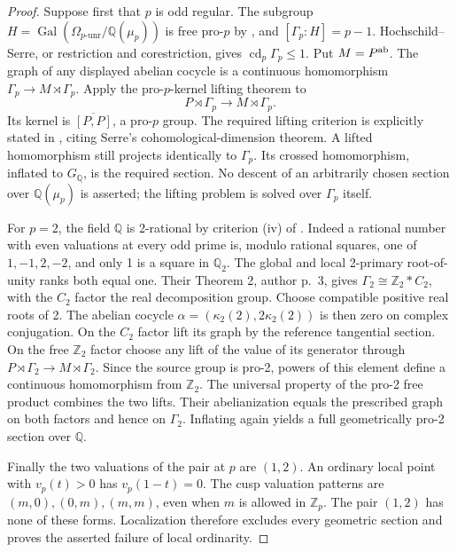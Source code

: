 \begin{proof}
Suppose first that \(p\) is odd regular. The subgroup
\(H=\operatorname{Gal}(\Omega_{p\text{-unr}}/\mathbb Q(\mu_p))\)
is free pro-\(p\) by \citet[Lemma 3.2, author p.~14]{LitHoshi2010},
and \([\Gamma_p:H]=p-1\). Hochschild--Serre, or restriction and
corestriction, gives \(\operatorname{cd}_p\Gamma_p\le1\).
Put \(M=P^{\rm ab}\). The graph of any displayed abelian cocycle is
a continuous homomorphism \(\Gamma_p\to M\rtimes\Gamma_p\).
Apply the pro-\(p\)-kernel lifting theorem to
\[
 P\rtimes\Gamma_p\longrightarrow M\rtimes\Gamma_p.
\]
Its kernel is \(\overline{[P,P]}\), a pro-\(p\) group. The required
lifting criterion is explicitly stated in
\citet[Proposition 4.3, p.~149]{LitPachecoStevenson2000}, citing
Serre's cohomological-dimension theorem. A lifted homomorphism still
projects identically to \(\Gamma_p\). Its crossed homomorphism,
inflated to \(G_{\mathbb Q}\), is the required section. No descent
of an arbitrarily chosen section over \(\mathbb Q(\mu_p)\) is asserted;
the lifting problem is solved over \(\Gamma_p\) itself.

For \(p=2\), the field \(\mathbb Q\) is 2-rational by criterion
(iv) of \citet[Theorem and Definition 0, author p.~2]{LitGrasJaulent2009}.
Indeed a rational number with even valuations at every odd prime is,
modulo rational squares, one of \(1,-1,2,-2\), and only 1 is a
square in \(\mathbb Q_2\). The global and local 2-primary
root-of-unity ranks both equal one. Their Theorem 2, author p.~3, gives
\(\Gamma_2\cong\mathbb Z_2*C_2\), with the \(C_2\) factor
the real decomposition group. Choose compatible positive real roots of 2.
The abelian cocycle \(\alpha=(\kappa_2(2),2\kappa_2(2))\) is then
zero on complex conjugation. On the \(C_2\) factor lift its graph by
the reference tangential section. On the free \(\mathbb Z_2\) factor
choose any lift of the value of its generator through
\(P\rtimes\Gamma_2\to M\rtimes\Gamma_2\).
Since the source group is pro-2, powers of this element define a continuous
homomorphism from \(\mathbb Z_2\). The universal property of the
pro-2 free product combines the two lifts. Their abelianization equals
the prescribed graph on both factors and hence on \(\Gamma_2\).
Inflating again yields a full geometrically pro-2 section over \(\mathbb Q\).

Finally the two valuations of the pair at \(p\) are \((1,2)\).
An ordinary local point with \(v_p(t)>0\) has \(v_p(1-t)=0\).
The cusp valuation patterns are \((m,0),(0,m),(m,m)\), even when
\(m\) is allowed in \(\mathbb Z_p\). The pair \((1,2)\) has none
of these forms. Localization therefore excludes every geometric section
and proves the asserted failure of local ordinarity.
\end{proof}

